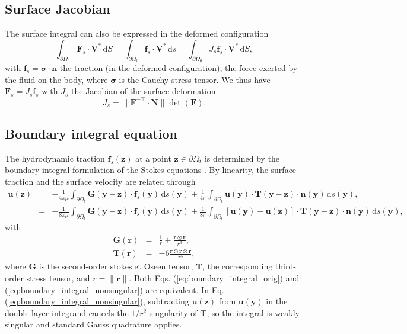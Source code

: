 \documentclass[aps,prfluids,groupedaddress]{revtex4-2}
\newcommand{\rmd}{\mathrm{d}}
\newcommand{\bff}{\bm{f}}
\newcommand{\bn}{\bm{n}}
\newcommand{\br}{\bm{r}}
\newcommand{\bu}{\bm{u}}
\newcommand{\by}{\bm{y}}
\newcommand{\bz}{\bm{z}}
\newcommand{\bF}{\bm{F}}
\newcommand{\bN}{\bm{N}}
\newcommand{\bT}{\bm{T}}
\newcommand{\bV}{\bm{V}}
\newcommand{\tI}{\bm{\mathit{1}}}
\newcommand{\tF}{\bm{{F}}}
\newcommand{\tG}{\bm{G}}
\newcommand{\tsigma}{\bm{{\sigma}}}
\begin{document}
\subsection{Surface Jacobian}
The surface integral can also be expressed in the deformed configuration
\begin{equation}\label{eq:surface_integral}
\int_{\partial \Omega_0} \bF_s \cdot \bV^* \, \rmd S = 
	\int_{\partial \Omega_t} \bff_s \cdot \bV^* \, \rmd s =
	\int_{\partial \Omega_0} J_s \bff_s \cdot \bV^* \, \rmd S,
\end{equation}
with $\bff_s = \tsigma\cdot \bn$ the traction (in the deformed configuration), the force exerted by the fluid on the body,
where $\tsigma$ is the Cauchy stress tensor. We thus have $\bF_s= J_s \bff_s$ with $J_s$ the Jacobian of the surface deformation
\begin{equation}\label{eq:surface_Jacobian}
J_s= \|\tF^{-\top}\cdot \bN\| \det(\tF). 
\end{equation}

\subsection{Boundary integral equation\label{sec:BIE}}
The hydrodynamic traction $\bff_s(\bz)$ at a point $\bz\in\partial\Omega_t$ is determined by the boundary integral formulation of the Stokes equations \cite{Pozrikidis1992}. By linearity, the surface traction and the surface velocity are related through
\begin{eqnarray}
\bu(\bz) & = & 
	- \frac{1}{4\pi\mu} \int_{\partial \Omega_t}
		\tG(\by - \bz)\cdot\bff_s(\by)\, \rmd s(\by) 
	+ \frac{1}{4\pi} \int_{\partial \Omega_t}
		\bu(\by) \cdot \bT(\by - \bz)\cdot\bn(\by)\, \rmd s(\by), \label{eq:boundary_integral_orig}\\
		& = & 
	- \frac{1}{8\pi\mu} \int_{\partial \Omega_t}
		\tG(\by - \bz)\cdot\bff_s(\by)\, \rmd s(\by) 
	+ \frac{1}{8\pi} \int_{\partial \Omega_t}
		\left[\bu(\by)-\bu(\bz)\right] \cdot \bT(\by - \bz)\cdot\bn(\by)\, \rmd s(\by),\label{eq:boundary_integral_nonsingular} 
\end{eqnarray}
with 
\begin{eqnarray}
\tG(\br) & = & \frac{\tI}{r}  + \frac{\br \otimes \br}{r^3},\\
\bT(\br) & = & - 6 \frac{\br \otimes \br  \otimes \br}{r^5},
\end{eqnarray}
where $\tG$ is the second-order stokeslet Oseen tensor, $\bT$, the corresponding third-order stress tensor, and $r=\|\br\|$. Both Eqs. (\ref{eq:boundary_integral_orig}) and (\ref{eq:boundary_integral_nonsingular}) are equivalent. In Eq. (\ref{eq:boundary_integral_nonsingular}), subtracting $\bu(\bz)$ from $\bu(\by)$ in the double-layer integrand cancels the $1/r^2$ singularity of $\bT$, so the integral is weakly singular and standard Gauss quadrature applies.
\end{document}
